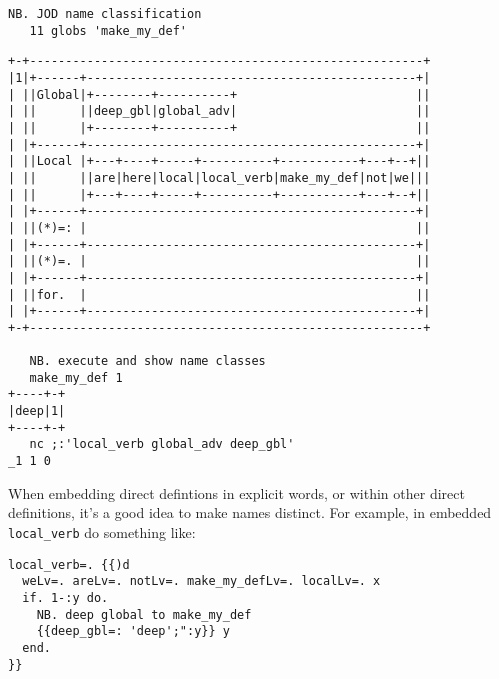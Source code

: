 \begin{lstlisting}[frame=single,framerule=0pt,basicstyle=\ttfamily\footnotesize]   
   NB. JOD name classification
   11 globs 'make_my_def' 
\end{lstlisting}

\newpage

\begin{lstlisting}[frame=single,framerule=0pt,basicstyle=\ttfamily\footnotesize]   
+-+-------------------------------------------------------+
|1|+------+----------------------------------------------+|
| ||Global|+--------+----------+                         ||
| ||      ||deep_gbl|global_adv|                         ||
| ||      |+--------+----------+                         ||
| |+------+----------------------------------------------+|
| ||Local |+---+----+-----+----------+-----------+---+--+||
| ||      ||are|here|local|local_verb|make_my_def|not|we|||
| ||      |+---+----+-----+----------+-----------+---+--+||
| |+------+----------------------------------------------+|
| ||(*)=: |                                              ||
| |+------+----------------------------------------------+|
| ||(*)=. |                                              ||
| |+------+----------------------------------------------+|
| ||for.  |                                              ||
| |+------+----------------------------------------------+|
+-+-------------------------------------------------------+
   
   NB. execute and show name classes
   make_my_def 1
+----+-+
|deep|1|
+----+-+
   nc ;:'local_verb global_adv deep_gbl' 
_1 1 0
\end{lstlisting}

When embedding direct defintions in explicit words, or within other direct definitions, it's a good idea to make names distinct.
For example, in embedded \texttt{local\_verb} do something like:

\begin{lstlisting}[frame=single,framerule=0pt,basicstyle=\ttfamily\footnotesize]   
local_verb=. {{)d
  weLv=. areLv=. notLv=. make_my_defLv=. localLv=. x
  if. 1-:y do.
    NB. deep global to make_my_def
    {{deep_gbl=: 'deep';":y}} y  
  end.
}}
\end{lstlisting}









